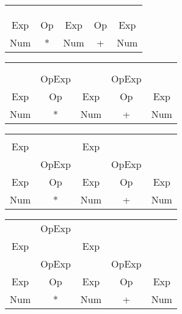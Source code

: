\documentclass[fleqn]{article}
\begin{document}
\vspace{0.5in}

\begin{tabular}{ | c | c | c | c  | c |}
\cline{1-1}
\\\cline{1-2}
 & \\\cline{1-3}
 &  &  \\\cline{1-4}
 &  &  &  \\\cline{1-5}
 Exp & Op & Exp & Op& Exp \\
\hline Num & * & Num & + & Num  \\
\hline

\end{tabular}

\vspace{0.5in}


\begin{tabular}{ | c | c | c | c  | c |}
\cline{1-1}
\\\cline{1-2}
 & \\\cline{1-3}
 &  &  \\\cline{1-4}
 & OpExp &  & OpExp \\\cline{1-5}
 Exp & Op & Exp & Op& Exp \\
\hline Num & * & Num & + & Num  \\
\hline

\end{tabular}

\vspace{0.5in}

\begin{tabular}{ | c | c | c | c  | c |}
\cline{1-1}
\\\cline{1-2}
 & \\\cline{1-3}
Exp &  & Exp \\\cline{1-4}
 & OpExp &  & OpExp \\\cline{1-5}
 Exp & Op & Exp & Op& Exp \\
\hline Num & * & Num & + & Num  \\
\hline

\end{tabular}

\vspace{0.5in}

\begin{tabular}{ | c | c | c | c  | c |}
\cline{1-1}
\\\cline{1-2}
 & OpExp\\\cline{1-3}
Exp &  & Exp \\\cline{1-4}
 & OpExp &  & OpExp \\\cline{1-5}
 Exp & Op & Exp & Op& Exp \\
\hline Num & * & Num & + & Num  \\
\hline

\end{tabular}
\vspace{0.5in}
\end{document}
